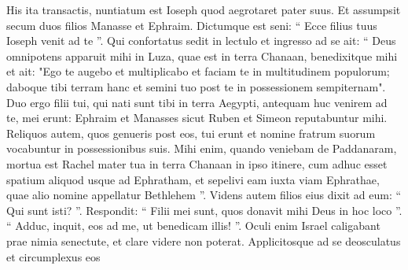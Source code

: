 \begin{biblechapter}
\begin{biblechapter}
\begin{biblechapter}
\begin{biblechapter}
\begin{biblechapter}
\begin{biblechapter}
\begin{biblechapter}
\begin{biblechapter}
\begin{biblechapter}
\begin{biblechapter}
\begin{biblechapter}
\begin{biblechapter}
\begin{biblechapter}
\begin{biblechapter}
\begin{biblechapter}
\begin{biblechapter}
\begin{biblechapter}
\begin{biblechapter}
\begin{biblechapter}
\begin{biblechapter}
\begin{biblechapter}
\begin{biblechapter}
\begin{biblechapter}
\begin{biblechapter}
\begin{biblechapter}
\begin{biblechapter}
\begin{biblechapter}
\begin{biblechapter}
\begin{biblechapter}
\begin{biblechapter}
\begin{biblechapter}
\begin{biblechapter}
\begin{biblechapter}
\begin{biblechapter}
\begin{biblechapter}
\begin{biblechapter}
\begin{biblechapter}
\begin{biblechapter}
\begin{biblechapter}
\begin{biblechapter}
\begin{biblechapter}
\begin{biblechapter}
\begin{biblechapter}
\begin{biblechapter}
\begin{biblechapter}
\begin{biblechapter}
\begin{biblechapter}
\begin{biblechapter}
\verse His ita transactis, nuntiatum est Ioseph quod aegrotaret pater suus. Et assumpsit secum duos filios Manasse et Ephraim. 
\verse Dictumque est seni: “ Ecce filius tuus Ioseph venit ad te ”. Qui confortatus sedit in lectulo 
\verse et ingresso ad se ait: “ Deus omnipotens apparuit mihi in Luza, quae est in terra Chanaan, benedixitque mihi 
\verse et ait: "Ego te augebo et multiplicabo et faciam te in multitudinem populorum; daboque tibi terram hanc et semini tuo post te in possessionem sempiternam". 
\verse Duo ergo filii tui, qui nati sunt tibi in terra Aegypti, antequam huc venirem ad te, mei erunt: Ephraim et Manasses sicut Ruben et Simeon reputabuntur mihi. 
\verse Reliquos autem, quos genueris post eos, tui erunt et nomine fratrum suorum vocabuntur in possessionibus suis. 
\verse Mihi enim, quando veniebam de Paddanaram, mortua est Rachel mater tua in terra Chanaan in ipso itinere, cum adhuc esset spatium aliquod usque ad Ephratham, et sepelivi eam iuxta viam Ephrathae, quae alio nomine appellatur Bethlehem ”.
 \verse Videns autem filios eius dixit ad eum: “ Qui sunt isti? ”. 
\verse Respondit: “ Filii mei sunt, quos donavit mihi Deus in hoc loco ”. “ Adduc, inquit, eos ad me, ut benedicam illis! ”. 
\verse Oculi enim Israel caligabant prae nimia senectute, et clare videre non poterat. Applicitosque ad se deosculatus et circumplexus eos 

\end{biblechapter}
\end{biblechapter}
\end{biblechapter}
\end{biblechapter}
\end{biblechapter}
\end{biblechapter}
\end{biblechapter}
\end{biblechapter}
\end{biblechapter}
\end{biblechapter}
\end{biblechapter}
\end{biblechapter}
\end{biblechapter}
\end{biblechapter}
\end{biblechapter}
\end{biblechapter}
\end{biblechapter}
\end{biblechapter}
\end{biblechapter}
\end{biblechapter}
\end{biblechapter}
\end{biblechapter}
\end{biblechapter}
\end{biblechapter}
\end{biblechapter}
\end{biblechapter}
\end{biblechapter}
\end{biblechapter}
\end{biblechapter}
\end{biblechapter}
\end{biblechapter}
\end{biblechapter}
\end{biblechapter}
\end{biblechapter}
\end{biblechapter}
\end{biblechapter}
\end{biblechapter}
\end{biblechapter}
\end{biblechapter}
\end{biblechapter}
\end{biblechapter}
\end{biblechapter}
\end{biblechapter}
\end{biblechapter}
\end{biblechapter}
\end{biblechapter}
\end{biblechapter}
\end{biblechapter}
